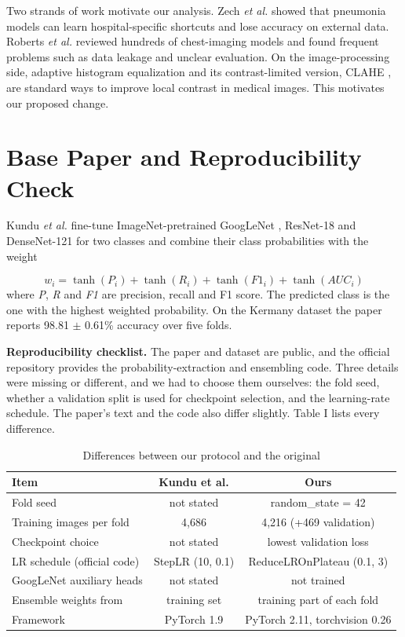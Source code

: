 \documentclass[conference]{IEEEtran}
\begin{document}
Two strands of work motivate our analysis. Zech \textit{et al.} \cite{zech} showed that pneumonia models can learn hospital-specific shortcuts and lose accuracy on external data. Roberts \textit{et al.} \cite{roberts} reviewed hundreds of chest-imaging models and found frequent problems such as data leakage and unclear evaluation. On the image-processing side, adaptive histogram equalization \cite{pizer} and its contrast-limited version, CLAHE \cite{zuiderveld}, are standard ways to improve local contrast in medical images. This motivates our proposed change.

\section{Base Paper and Reproducibility Check}
Kundu \textit{et al.} fine-tune ImageNet-pretrained GoogLeNet \cite{googlenet}, ResNet-18 \cite{resnet} and DenseNet-121 \cite{densenet} for two classes and combine their class probabilities with the weight

\begin{equation}
w_i = \tanh(P_i) + \tanh(R_i) + \tanh(F1_i) + \tanh(\mathit{AUC}_i)
\end{equation}
where \textit{P}, \textit{R} and \textit{F1} are precision, recall and F1 score. The predicted class is the one with the highest weighted probability. On the Kermany dataset the paper reports 98.81 $\pm$ 0.61\% accuracy over five folds.

\textbf{Reproducibility checklist.} The paper and dataset are public, and the official repository provides the probability-extraction and ensembling code. Three details were missing or different, and we had to choose them ourselves: the fold seed, whether a validation split is used for checkpoint selection, and the learning-rate schedule. The paper's text and the code also differ slightly. Table I lists every difference.

\begin{table}[!t]
\caption{Differences between our protocol and the original}
\centering
\footnotesize
\setlength{\tabcolsep}{3pt}
\begin{tabular}{lcc}
\hline
\textbf{Item} & \textbf{Kundu et al.} & \textbf{Ours} \\
\hline
Fold seed & not stated & random\_state = 42 \\
Training images per fold & 4,686 & 4,216 (+469 validation) \\
Checkpoint choice & not stated & lowest validation loss \\
LR schedule (official code) & StepLR (10, 0.1) & ReduceLROnPlateau (0.1, 3) \\
GoogLeNet auxiliary heads & not stated & not trained \\
Ensemble weights from & training set & training part of each fold \\
Framework & PyTorch 1.9 & PyTorch 2.11, torchvision 0.26 \\
\hline
\end{tabular}
\end{table}
\end{document}
